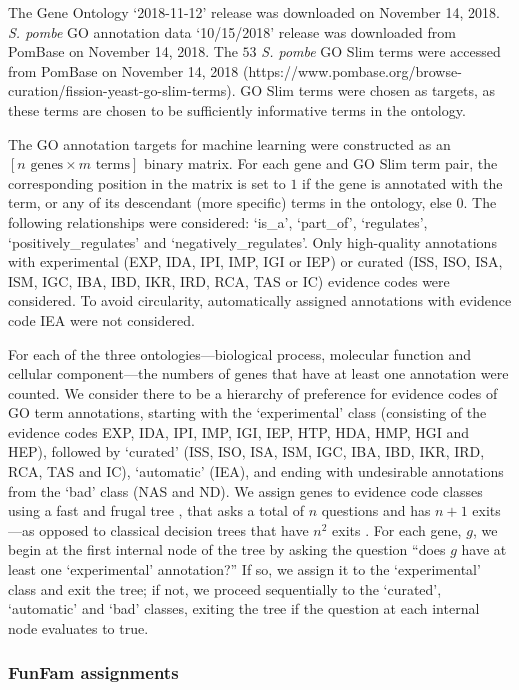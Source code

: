 The Gene Ontology \cite{TheGeneOntologyConsortium2015} `2018-11-12' release was downloaded on November 14, 2018. \emph{S. pombe} GO annotation data `10/15/2018' release was downloaded from PomBase \cite{Lock2018} on November 14, 2018. The $53$ \emph{S. pombe} GO Slim terms were accessed from PomBase on November 14, 2018 (https://www.pombase.org/browse-curation/fission-yeast-go-slim-terms). GO Slim terms were chosen as targets, as these terms are chosen to be sufficiently informative terms in the ontology.

The GO annotation targets for machine learning were constructed as an $[n\text{ genes} \times m\text{ terms}]$ binary matrix. For each gene and GO Slim term pair, the corresponding position in the matrix is set to $1$ if the gene is annotated with the term, or any of its descendant (more specific) terms in the ontology, else $0$. The following relationships were considered: `is\_a', `part\_of', `regulates', `positively\_regulates' and `negatively\_regulates'. Only high-quality annotations with experimental (EXP, IDA, IPI, IMP, IGI or IEP) or curated (ISS, ISO, ISA, ISM, IGC, IBA, IBD, IKR, IRD, RCA, TAS or IC) evidence codes were considered. To avoid circularity, automatically assigned annotations with evidence code IEA were not considered.

For each of the three ontologies---biological process, molecular function and cellular component---the numbers of genes that have at least one annotation were counted. We consider there to be a hierarchy of preference for evidence codes of GO term annotations, starting with the `experimental' class (consisting of the evidence codes EXP, IDA, IPI, IMP, IGI, IEP, HTP, HDA, HMP, HGI and HEP), followed by `curated' (ISS, ISO, ISA, ISM, IGC, IBA, IBD, IKR, IRD, RCA, TAS and IC), `automatic' (IEA), and ending with undesirable annotations from the `bad' class (NAS and ND). We assign genes to evidence code classes using a fast and frugal tree \cite{Martignon2005,Raab2015}, that asks a total of $n$ questions and has $n+1$ exits---as opposed to classical decision trees that have $n^2$ exits \cite{Raab2015}. For each gene, $g$, we begin at the first internal node of the tree by asking the question ``does $g$ have at least one `experimental' annotation?'' If so, we assign it to the `experimental' class and exit the tree; if not, we proceed sequentially to the `curated', `automatic' and `bad' classes, exiting the tree if the question at each internal node evaluates to true.

\subsubsection{FunFam assignments}


